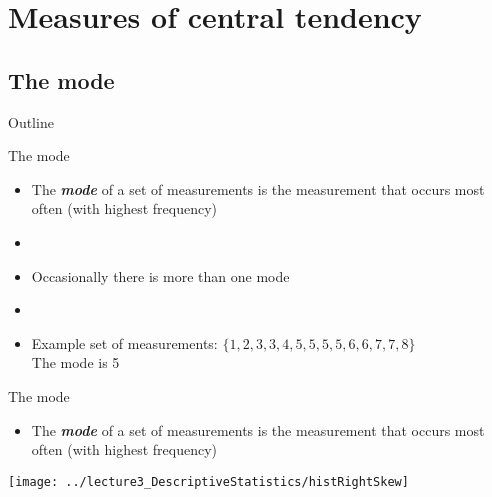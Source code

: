 \documentclass[xcolor=dvipsnames]{beamer}
\begin{document}
\section{Measures of central tendency}
\subsection{The mode}

\begin{frame}{Outline}
	\tableofcontents[currentsection,subsectionstyle=show/shaded/hide]
\end{frame}

\begin{frame}{The mode}
	\begin{itemize}
		\item The \emph{\textbf{mode}} of a set of measurements is the measurement that occurs most often (with highest frequency) \pause
		\item[]
		\item Occasionally there is more than one mode \pause
		\item[]
		\item Example set of measurements: $\{1, 2, 3, 3, 4, 5, 5, 5, 5, 6, 6, 7, 7, 8\}$\\
		The mode is 5
	\end{itemize}
\end{frame}


\begin{frame}{The mode}
	\begin{itemize}
		\item The \emph{\textbf{mode}} of a set of measurements is the measurement that occurs most often (with highest frequency)
	\end{itemize}
	\begin{center}
			\texttt{[image: ../lecture3\_DescriptiveStatistics/histRightSkew]}
	\end{center}
\end{frame}
\end{document}
